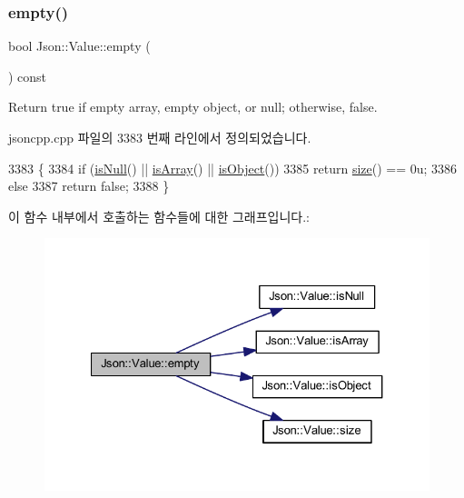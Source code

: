 \subsubsection{\texorpdfstring{empty()}{empty()}}
{\footnotesize\ttfamily bool Json\+::\+Value\+::empty (\begin{DoxyParamCaption}{ }\end{DoxyParamCaption}) const}



Return true if empty array, empty object, or null; otherwise, false. 



jsoncpp.\+cpp 파일의 3383 번째 라인에서 정의되었습니다.


\begin{DoxyCode}
3383                         \{
3384   \textcolor{keywordflow}{if} (\hyperlink{class_json_1_1_value_abde4070e21e46dc4f8203f66582cb19f}{isNull}() || \hyperlink{class_json_1_1_value_a1627eb9d6568d6d0252fa8bb711c0a59}{isArray}() || \hyperlink{class_json_1_1_value_a8cf96c0f2a552051fcfc78ffee60e037}{isObject}())
3385     \textcolor{keywordflow}{return} \hyperlink{class_json_1_1_value_a0ec2808e1d7efa4e9fad938d6667be44}{size}() == 0u;
3386   \textcolor{keywordflow}{else}
3387     \textcolor{keywordflow}{return} \textcolor{keyword}{false};
3388 \}
\end{DoxyCode}
이 함수 내부에서 호출하는 함수들에 대한 그래프입니다.\+:
\nopagebreak
\begin{figure}[H]
\begin{center}
\leavevmode
\includegraphics[width=327pt]{class_json_1_1_value_a0519a551e37ee6665d74742b3f96bab3_cgraph}
\end{center}
\end{figure}
\mbox{\label{class_json_1_1_value_a3e443cd0ef24f7e028b175e47ee045e0}} 
